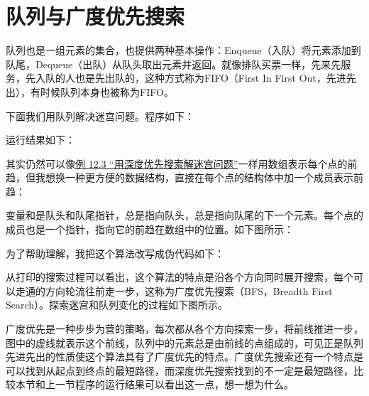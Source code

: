 
\section{队列与广度优先搜索}
%
队列也是一组元素的集合，也提供两种基本操作：Enqueue（入队）将元素添加到队尾，Dequeue（出队）从队头取出元素并返回。就像排队买票一样，先来先服务，先入队的人也是先出队的，这种方式称为FIFO（First In First Out，先进先出），有时候队列本身也被称为FIFO。



下面我们用队列解决迷宫问题。程序如下：





运行结果如下：




其实仍然可以像\hyperlink{db.ch12s03.id2750166}{例 12.\BookSplit{}3 “用深度优先搜索解迷宫问题”}一样用数组表示每个点的前趋，但我想换一种更方便的数据结构，直接在每个点的结构体中加一个成员表示前趋：




变量和是队头和队尾指针，总是指向队头，总是指向队尾的下一个元素。每个点的成员也是一个指针，指向它的前趋在数组中的位置。如下图所示：




为了帮助理解，我把这个算法改写成伪代码如下：




从打印的搜索过程可以看出，这个算法的特点是沿各个方向同时展开搜索，每个可以走通的方向轮流往前走一步，这称为广度优先搜索（BFS，Breadth First Search）。探索迷宫和队列变化的过程如下图所示。




广度优先是一种步步为营的策略，每次都从各个方向探索一步，将前线推进一步，图中的虚线就表示这个前线，队列中的元素总是由前线的点组成的，可见正是队列先进先出的性质使这个算法具有了广度优先的特点。广度优先搜索还有一个特点是可以找到从起点到终点的最短路径，而深度优先搜索找到的不一定是最短路径，比较本节和上一节程序的运行结果可以看出这一点，想一想为什么。


